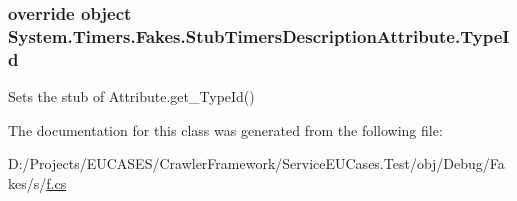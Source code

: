 \hypertarget{class_system_1_1_timers_1_1_fakes_1_1_stub_timers_description_attribute_ae2ad0faa5977d4358ed0a516e303cdf7}{
\subsubsection[{Type\-Id}]{\setlength{\rightskip}{0pt plus 5cm}override object System.\-Timers.\-Fakes.\-Stub\-Timers\-Description\-Attribute.\-Type\-Id\hspace{0.3cm}{\ttfamily [get]}}}\label{class_system_1_1_timers_1_1_fakes_1_1_stub_timers_description_attribute_ae2ad0faa5977d4358ed0a516e303cdf7}


Sets the stub of Attribute.\-get\-\_\-\-Type\-Id()



The documentation for this class was generated from the following file\-:\begin{DoxyCompactItemize}
\item 
D\-:/\-Projects/\-E\-U\-C\-A\-S\-E\-S/\-Crawler\-Framework/\-Service\-E\-U\-Cases.\-Test/obj/\-Debug/\-Fakes/s/\hyperlink{s_2f_8cs}{f.\-cs}\end{DoxyCompactItemize}
